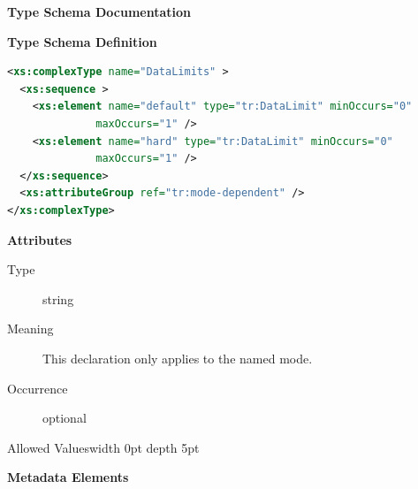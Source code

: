 \documentclass{ivoa}
\begin{document}
\begin{generated}
\begingroup
        \renewcommand*\descriptionlabel[1]{%
        \hbox to 5.5em{\emph{#1}\hfil}}\vspace{2ex}\noindent\textbf{ Type Schema Documentation}


\vspace{1ex}\noindent\textbf{ Type Schema Definition}

\begin{lstlisting}[language=XML,basicstyle=\footnotesize]
<xs:complexType name="DataLimits" >
  <xs:sequence >
    <xs:element name="default" type="tr:DataLimit" minOccurs="0"
              maxOccurs="1" />
    <xs:element name="hard" type="tr:DataLimit" minOccurs="0"
              maxOccurs="1" />
  </xs:sequence>
  <xs:attributeGroup ref="tr:mode-dependent" />
</xs:complexType>
\end{lstlisting}

\vspace{0.5ex}\noindent\textbf{ Attributes}

\begingroup\small\begin{bigdescription}\item[forMode]
\begin{description}
\item[Type] string
\item[Meaning] This declaration only applies to the named mode.
\item[Occurrence] optional

\item[Allowed Values\vrule width 0pt depth 5pt]\hfil
\end{description}

\end{bigdescription}\endgroup



\vspace{0.5ex}\noindent\textbf{ Metadata Elements}


\end{generated}
\end{document}
